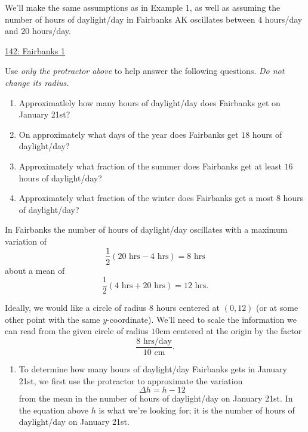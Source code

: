 \documentclass{ximera}
\begin{document}
\begin{example} \label{Ex:PDFIRgv4rr}
We'll make the same assumptions as in Example 1, as well as assuming the number of hours of daylight/day in Fairbanks AK oscillates between $4$ hours/day and $20$ hours/day.

\begin{onlineOnly}
    \begin{center}
\end{center}
\end{onlineOnly}

\href{https://www.desmos.com/calculator/nfihqizmdm}{142: Fairbanks 1}

Use \emph{only the protractor above} to help answer the following questions. \emph{Do not change its radius.}

\begin{enumerate}
\item Approximatlely how many hours of daylight/day does Fairbanks get on January 21st?

\item On approximately what days of the year does Fairbanks get $18$ hours of daylight/day? 

\item Approximately what fraction of the summer does Fairbanks get at least $16$ hours of daylight/day?

\item Approximately what fraction of the winter does Fairbanks get a most $8$ hours of daylight/day?

\end{enumerate}

\begin{explanation}


In Fairbanks the number of hours of daylight/day oscillates with a maximum variation of
\[
  \frac{1}{2}\left(20 \text{ hrs} - 4\text{ hrs}  \right) = 8 \text{ hrs}
\]
about a mean of
\[
       \frac{1}{2}\left(4 \text{ hrs} + 20\text{ hrs}  \right) = 12 \text{ hrs} .    
\]

Ideally, we would like a circle of radius $8$ hours centered at $(0,12)$ (or at some other point with the same $y$-coordinate). We'll need to scale the information we can read from the given circle of radius $10$cm centered at the origin by the factor
\[
   \frac{8 \text{ hrs/day}}{10 \text{ cm}} .
\] 

\begin{enumerate}

\item To determine how many hours of daylight/day Fairbanks gets in January 21st, we first use the protractor to approximate the variation 
\[
    \Delta h = h - 12
\]
from the mean in the number of hours of daylight/day on January 21st. In the equation above $h$ is what we're looking for; it is the number of hours of daylight/day on January 21st.


\end{enumerate}
\end{explanation}
\end{example}
\end{document}
